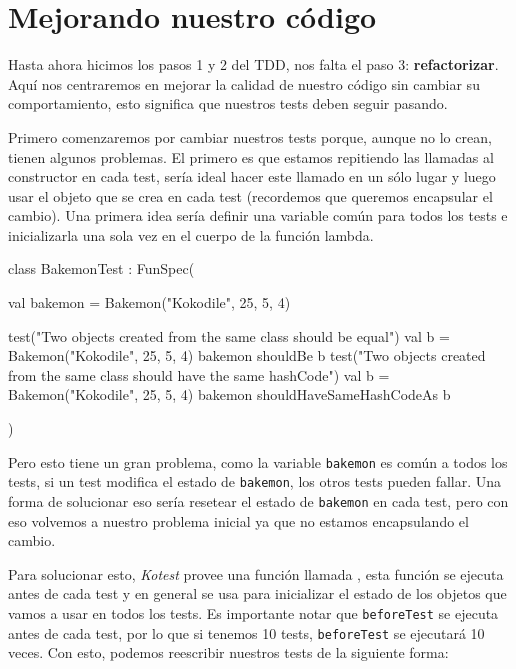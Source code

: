 \section{Mejorando nuestro código}
\label{sec:refactor}

  Hasta ahora hicimos los pasos 1 y 2 del TDD, nos falta el paso 3: \textbf{refactorizar}.
  Aquí nos centraremos en mejorar la calidad de nuestro código sin cambiar su comportamiento, esto
  significa que nuestros tests deben seguir pasando.

  Primero comenzaremos por cambiar nuestros tests porque, aunque no lo crean, tienen algunos 
  problemas.
  El primero es que estamos repitiendo las llamadas al constructor en cada test, sería ideal 
  hacer este llamado en un sólo lugar y luego usar el objeto que se crea en cada test (recordemos
  que queremos encapsular el cambio).
  Una primera idea sería definir una variable común para todos los tests e inicializarla una sola 
  vez en el cuerpo de la función lambda.

  \begin{kotlin}
    class BakemonTest : FunSpec({
      val bakemon = Bakemon("Kokodile", 25, 5, 4)

      test("Two objects created from the same class should be equal") {
        val b = Bakemon("Kokodile", 25, 5, 4)
        bakemon shouldBe b
      }
      test("Two objects created from the same class should have the same hashCode") {
        val b = Bakemon("Kokodile", 25, 5, 4)
        bakemon shouldHaveSameHashCodeAs b
      }
    })
  \end{kotlin}

  Pero esto tiene un gran problema, como la variable \texttt{bakemon} es común a todos los tests,
  si un test modifica el estado de \texttt{bakemon}, los otros tests pueden fallar.
  Una forma de solucionar eso sería resetear el estado de \texttt{bakemon} en cada test, pero
  con eso volvemos a nuestro problema inicial ya que no estamos encapsulando el cambio.

  Para solucionar esto, \textit{Kotest} provee una función llamada , esta 
  función se ejecuta antes de cada test y en general se usa para inicializar el estado de los 
  objetos que vamos a usar en todos los tests.
  Es importante notar que \texttt{beforeTest} se ejecuta antes de cada test, por lo que si tenemos
  10 tests, \texttt{beforeTest} se ejecutará 10 veces.
  Con esto, podemos reescribir nuestros tests de la siguiente forma:

